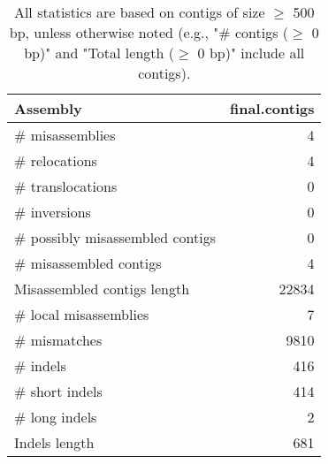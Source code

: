 \documentclass[12pt,a4paper]{article}
\begin{document}
\begin{table}[ht]
\begin{center}
\caption{All statistics are based on contigs of size $\geq$ 500 bp, unless otherwise noted (e.g., "\# contigs ($\geq$ 0 bp)" and "Total length ($\geq$ 0 bp)" include all contigs).}
\begin{tabular}{|l*{1}{|r}|}
\hline
Assembly & final.contigs \\ \hline
\# misassemblies & 4 \\ \hline
\hspace{5mm}\# relocations & 4 \\ \hline
\hspace{5mm}\# translocations & 0 \\ \hline
\hspace{5mm}\# inversions & 0 \\ \hline
\# possibly misassembled contigs & 0 \\ \hline
\# misassembled contigs & 4 \\ \hline
Misassembled contigs length & 22834 \\ \hline
\# local misassemblies & 7 \\ \hline
\# mismatches & 9810 \\ \hline
\# indels & 416 \\ \hline
\hspace{5mm}\# short indels & 414 \\ \hline
\hspace{5mm}\# long indels & 2 \\ \hline
Indels length & 681 \\ \hline
\end{tabular}
\end{center}
\end{table}
\end{document}
